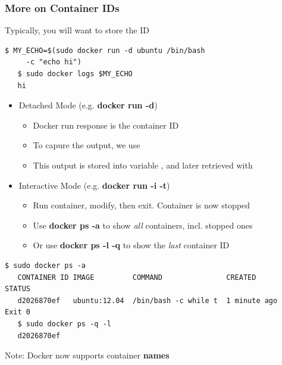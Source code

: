 \documentclass[xcolor=dvipsnames]{beamer}
\newcommand{\cpause}{}
\begin{document}
\begin{frame}[fragile]
  \frametitle{More on Container IDs}

  \vspace{-2mm}
  Typically, you will want to store the ID \cpause

  \begin{lstlisting}[basicstyle=\tiny]
   $ MY_ECHO=$(sudo docker run -d ubuntu /bin/bash 
     -c "echo hi")
   $ sudo docker logs $MY_ECHO
   hi
  \end{lstlisting}

  \vspace{-2mm}
  \begin{itemize}
  \item Detached Mode (e.g. \textbf{docker run -d}) \cpause
    \begin{itemize}
    \item Docker run response is the container ID \cpause
    \item To capure the output, we use  \cpause
    \item This output is stored into variable , and later retrieved with  \cpause
    \end{itemize}
  \vspace{-1mm}
  \item Interactive Mode (e.g. \textbf{docker run -i -t})
    \begin{itemize}
    \item Run container, modify, then exit. Container is now stopped \cpause
    \item Use \textbf{docker ps -a} to show \textit{all} containers, incl. stopped ones \cpause
    \item Or use \textbf{docker ps -l -q} to show the \textit{last} container ID 
    \cpause
    \end{itemize}
  \end{itemize}

  \vspace{-2mm}
  \begin{lstlisting}[basicstyle=\tiny]
   $ sudo docker ps -a
   CONTAINER ID IMAGE         COMMAND               CREATED        STATUS    
   d2026870ef   ubuntu:12.04  /bin/bash -c while t  1 minute ago   Exit 0  
   $ sudo docker ps -q -l
   d2026870ef
  \end{lstlisting} 
  \cpause

  \vspace{-1mm}
  Note: Docker now supports container \textbf{names}

\end{frame}
\end{document}
